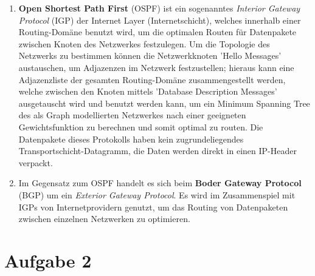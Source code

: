 \documentclass[numbers=noendperiod]{scrartcl}
\begin{document}
\begin{enumerate}
	\item \textbf{Open Shortest Path First} (OSPF) ist ein sogenanntes \textit{Interior Gateway Protocol} (IGP) der Internet Layer (Internetschicht), welches innerhalb einer Routing-Domäne benutzt wird, um die optimalen Routen für Datenpakete zwischen Knoten des Netzwerkes festzulegen. Um die Topologie des Netzwerks zu bestimmen können die Netzwerkknoten 'Hello Messages' austauschen, um Adjazenzen im Netzwerk festzustellen; hieraus kann eine Adjazenzliste der gesamten Routing-Domäne zusammengestellt werden, welche zwischen den Knoten mittels 'Database Description Messages' ausgetauscht wird und benutzt werden kann, um ein Minimum Spanning Tree des als Graph modellierten Netzwerkes nach einer geeigneten Gewichtsfunktion zu berechnen und somit optimal zu routen. Die Datenpakete dieses Protokolls haben kein zugrundeliegendes Transportschicht-Datagramm, die Daten werden direkt in einen IP-Header verpackt.
	
	\item Im Gegensatz zum OSPF handelt es sich beim \textbf{Boder Gateway Protocol} (BGP) um ein \textit{Exterior Gateway Protocol}. Es wird im Zusammenspiel mit IGPs von Internetprovidern genutzt, um das Routing von Datenpaketen zwischen einzelnen Netzwerken zu optimieren.
	
	
\end{enumerate}

\section*{Aufgabe 2}

\end{document}
